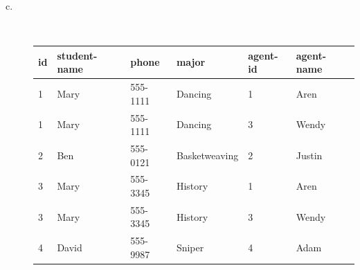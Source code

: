 \documentclass{article}
\begin{document}
\begin{description}
\item[c.]
\ \\
\begin{tabular}{l|l|l|l|l|l}
id & student-name & phone    & major         & agent-id & agent-name\\
\hline
1  & Mary         & 555-1111 & Dancing       & 1        & Aren\\
1  & Mary         & 555-1111 & Dancing       & 3        & Wendy\\
2  & Ben          & 555-0121 & Basketweaving & 2        & Justin\\
3  & Mary         & 555-3345 & History       & 1        & Aren\\
3  & Mary         & 555-3345 & History       & 3        & Wendy\\
4  & David        & 555-9987 & Sniper        & 4        & Adam\\
\end{tabular}
\end{description}
\end{document}

